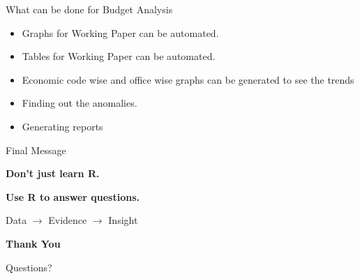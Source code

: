 \documentclass[aspectratio=169,11pt]{beamer}
\begin{document}
	\begin{frame}{What can be done for Budget Analysis}
		
		\begin{itemize}
			\item Graphs for Working Paper can be automated.
			
			\item Tables for Working Paper can be automated.
			
			\item Economic code wise and office wise graphs can be generated to see the trends
			
			\item Finding out the anomalies.
			
			\item Generating reports
		\end{itemize}
		
	\end{frame}
	
	
	\begin{frame}{Final Message}
		
		\begin{center}
			
			\Huge
			\textbf{Don't just learn R.}
			
			\vspace{0.5cm}
			
			\Huge
			\textbf{Use R to answer questions.}
			
			\vspace{1cm}
			
			\Large
			Data $\rightarrow$ Evidence $\rightarrow$ Insight
			
		\end{center}
		
	\end{frame}
	
	
	\begin{frame}
		\centering
		\Huge
		\textbf{Thank You}
		
		\vspace{0.5cm}
		
		\Large
		Questions?
		
	\end{frame}
	
	
\end{document}
